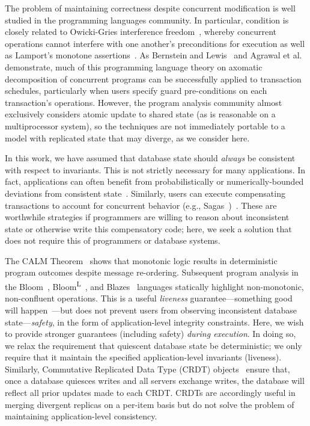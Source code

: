  The problem of maintaining correctness
despite concurrent modification is well studied in the programming
languages community. In particular, \iconfluence condition is closely
related to Owicki-Gries interference
  freedom~\cite{owickigries}, whereby concurrent operations cannot
interfere with one another's preconditions for execution as well as
Lamport's monotone assertions~\cite{lamport-safety}. As
Bernstein and Lewis~\cite{decomp-semantics} and Agrawal et
al.~\cite{agarwal-consistency} demonstrate, much of this programming
language theory on axomatic decomposition of concurrent programs can
be successfully applied to transaction schedules, particularly when
users specify guard pre-conditions on each transaction's
operations. However, the program analysis community almost exclusively
considers atomic update to shared state (as is reasonable on a
multiprocessor system), so the techniques are not immediately portable
to a model with replicated state that may diverge, as we consider
here.

 In this work, we have assumed that
database state should \textit{always} be consistent with respect to
invariants. This is not strictly necessary for many applications. In
fact, applications can often benefit from probabilistically or
numerically-bounded deviations from consistent
state~\cite{epsilon-divergence}. Similarly, users can execute
compensating transactions to account for concurrent behavior (e.g.,
Sagas~\cite{sagas})~\cite{ic-survey,ic-survey-two}. These are worthwhile
strategies if programmers are willing to reason about inconsistent
state or otherwise write this compensatory code; here,
we seek a solution that does not require this of programmers or
database systems.

 The CALM
Theorem~\cite{ameloot-calm} shows that monotonic logic results in
deterministic program outcomes despite message re-ordering. Subsequent
program analysis in the Bloom~\cite{calm},
Bloom\textsuperscript{L}~\cite{blooml}, and Blazes~\cite{blazes}
languages statically highlight non-monotonic, non-confluent
operations. This is a useful \textit{liveness} guarantee---something
good will happen~\cite{lamport-safety}---but does not prevent users
from observing inconsistent database state---\textit{safety}, in the
form of application-level integrity constraints.  Here, we wish to
provide stronger guarantees (including safety) \textit{during
  execution}. In doing so, we relax the requirement that quiescent
database state be deterministic; we only require that it maintain the
specified application-level invariants (liveness). Similarly,
Commutative Replicated Data Type (CRDT) objects~\cite{crdt} ensure
that, once a database quiesces writes and all servers exchange writes,
the database will reflect all prior updates made to each CRDT. CRDTs
are accordingly useful in merging divergent replicas on a per-item
basis but do not solve the problem of maintaining application-level
consistency.

